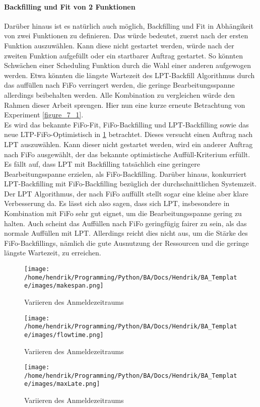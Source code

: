 \FloatBarrier

\paragraph{Backfilling und Fit von 2 Funktionen} Darüber hinaus ist es natürlich auch möglich, Backfilling und Fit in Abhängikeit von zwei Funktionen zu definieren. Das würde bedeutet, zuerst nach der ersten Funktion auszuwählen. Kann diese nicht gestartet werden, würde nach der zweiten Funktion aufgefüllt oder ein startbarer Auftrag gestartet. So könnten Schwächen einer Scheduling Funktion durch die Wahl einer anderen aufgewogen werden. Etwa könnten die längste Wartezeit des LPT-Backfill Algorithmus durch das auffüllen nach FiFo verringert werden, die geringe Bearbeitungsspanne allerdings beibehalten werden. Alle Kombination zu vergleichen würde den Rahmen dieser Arbeit sprengen. Hier nun eine kurze erneute Betrachtung von Experiment \ref{figure_7_1}.\\
Es wird das bekannte FiFo-Fit, FiFo-Backfilling und LPT-Backfilling sowie das neue LTP-FiFo-Optimistisch in \ref{figure_makespan} betrachtet. Dieses versucht einen Auftrag nach LPT auszuwählen. Kann dieser nicht gestartet werden, wird ein anderer Auftrag nach FiFo ausgewählt, der das bekannte optimistische Auffüll-Kriterium erfüllt.\\
Es fällt auf, dass LPT mit Backfilling tatsächlich eine geringere Bearbeitungsspanne erzielen, als FiFo-Backfilling. Darüber hinaus, konkurriert LPT-Backfilling mit FiFo-Backfilling bezüglich der durchschnittlichen Systemzeit. Der LPT Algorithmus, der nach FiFo auffüllt stellt sogar eine kleine aber klare Verbesserung da. Es lässt sich also sagen, dass sich LPT, insbesondere in Kombination mit FiFo sehr gut eignet, um die Bearbeitungsspanne gering zu halten. Auch scheint das Auffüllen nach FiFo geringfügig fairer zu sein, als das normale Auffüllen mit LPT. Allerdings reicht dies nicht aus, um die Stärke des FiFo-Backfillings, nämlich die gute Ausnutzung der Ressourcen und die geringe längste Wartezeit, zu erreichen.
\begin{figure}	
	\texttt{[image: /home/hendrik/Programming/Python/BA/Docs/Hendrik/BA\_Template/images/makespan.png]}
	\caption{Variieren des Anmeldezeitraums}
	\label{figure_makespan}
\end{figure}
\begin{figure}	
	\texttt{[image: /home/hendrik/Programming/Python/BA/Docs/Hendrik/BA\_Template/images/flowtime.png]}
	\caption{Variieren des Anmeldezeitraums}
	\label{figure_flowtime}
\end{figure}
\begin{figure}	
	\texttt{[image: /home/hendrik/Programming/Python/BA/Docs/Hendrik/BA\_Template/images/maxLate.png]}
	\caption{Variieren des Anmeldezeitraums}
	\label{figure_maxLate}
\end{figure}


